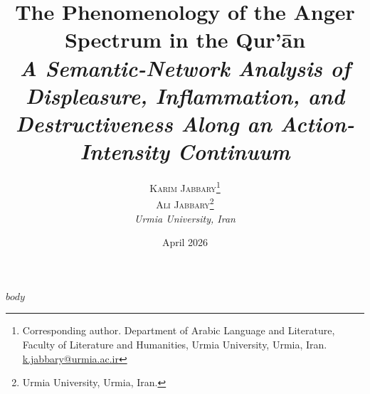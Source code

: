 \documentclass[11pt,a4paper]{article}
\title{\Large\bfseries The Phenomenology of the Anger Spectrum in the Qur'\=an\\[0.4em]
  \normalsize\textit{A Semantic-Network Analysis of Displeasure, Inflammation, and Destructiveness Along an Action-Intensity Continuum}}
\author{
  \textsc{Karim Jabbary}\thanks{Corresponding author. Department of Arabic Language and Literature, Faculty of Literature and Humanities, Urmia University, Urmia, Iran. \href{mailto:k.jabbary@urmia.ac.ir}{k.jabbary@urmia.ac.ir}}\\
  \textsc{Ali Jabbary}\thanks{Urmia University, Urmia, Iran.}\\[0.6em]
  \small\textit{Urmia University, Iran}
}
\date{April 2026}
\begin{document}
$body$
\end{document}

